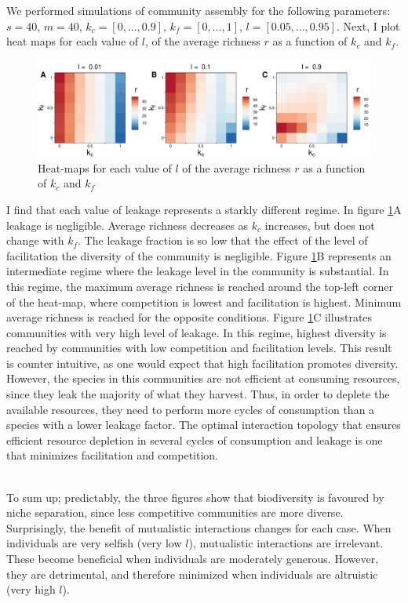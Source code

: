 \documentclass[12pt]{article}
\begin{document}
        	We performed simulations of community assembly for the following parameters: $ s = 40 $, $ m = 40 $, $ k_c = [0,  \dots, 0.9]$, $ k_f = [0, \dots, 1]$, $ l = [0.05, \dots, 0.95]$. Next, I plot heat maps for each value of $ l $, of the average richness $ r $ as a function of $ k_c $ and $ k_f $. 
        	\begin{figure}[h]
        		\centering
        		\includegraphics[width=\textwidth]{kc_kf_richness.pdf}
        		\caption{Heat-maps for each value of $ l $ of the average richness $ r $ as a function of $ k_c $ and $ k_f $}
        		\label{kc_kf_richness}
        	\end{figure}
        	I find that each value of leakage represents a starkly different regime. In figure \ref{kc_kf_richness}A leakage is negligible. Average richness decreases as $ k_c $ increases, but does not change with $ k_f $. The leakage fraction is so low that the effect of the level of facilitation the diversity of the community is negligible. Figure \ref{kc_kf_richness}B represents an intermediate regime where the leakage level in the community is substantial. In this regime, the maximum average richness is reached around the top-left corner of the heat-map, where competition is lowest and facilitation is highest. Minimum average richness is reached for the opposite conditions. Figure \ref{kc_kf_richness}C illustrates communities with very high level of leakage. In this regime, highest diversity is reached by communities with low competition and facilitation levels. This result is counter intuitive, as one would expect that high facilitation promotes diversity. However, the species in  this communities are not efficient at consuming resources, since they leak the majority of what they harvest. Thus, in order to deplete the available resources, they need to perform more cycles of consumption than a species with a lower leakage factor. The optimal interaction topology that ensures efficient resource depletion in several cycles of consumption and leakage is one that minimizes facilitation and competition. \par\\
        	To sum up; predictably, the three figures show that biodiversity is favoured by niche separation, since less competitive communities are more diverse. Surprisingly, the benefit of mutualistic interactions changes for each case. When individuals are very selfish (very low $l$), mutualistic interactions are irrelevant. These become beneficial when individuals are moderately generous. However, they are detrimental, and therefore minimized when individuals are altruistic (very high $l$).
    
\end{document}
